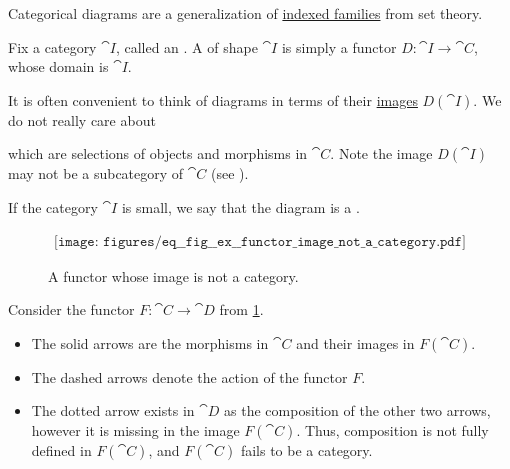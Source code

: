 \begin{definition}\label{def:categorical_diagram}
  Categorical diagrams are a generalization of \hyperref[def:tuple_and_cartesian_product/indexed_family]{indexed families} from set theory.

  Fix a category \( \cat{I} \), called an . A  of shape \( \cat{I} \) is simply a functor \( D: \cat{I} \to \cat{C} \), whose domain is \( \cat{I} \).

  It is often convenient to think of diagrams in terms of their \hyperref[def:functor_image]{images} \( D(\cat{I}) \). We do not really care about

   which are selections of objects and morphisms in \( \cat{C} \). Note the image \( D(\cat{I}) \) may not be a subcategory of \( \cat{C} \) (see ).

  If the category \( \cat{I} \) is small, we say that the diagram is a .
\end{definition}

\begin{example}\label{ex:functor_image_not_a_category}
  \begin{figure}
    \begin{equation*}
      \begin{aligned}
        \texttt{[image: figures/eq\_\_fig\_\_ex\_\_functor\_image\_not\_a\_category.pdf]}
      \end{aligned}
    \end{equation*}
    \caption{A functor whose image is not a category.}\label{fig:ex:functor_image_not_a_category}
  \end{figure}

  Consider the functor \( F: \cat{C} \to \cat{D} \) from \cref{fig:ex:functor_image_not_a_category}.

  \begin{itemize}
    \item The solid arrows are the morphisms in \( \cat{C} \) and their images in \( F(\cat{C}) \).
    \item The dashed arrows denote the action of the functor \( F \).
    \item The dotted arrow exists in \( \cat{D} \) as the composition of the other two arrows, however it is missing in the image \( F(\cat{C}) \). Thus, composition is not fully defined in \( F(\cat{C}) \), and \( F(\cat{C}) \) fails to be a category.
  \end{itemize}
\end{example}
